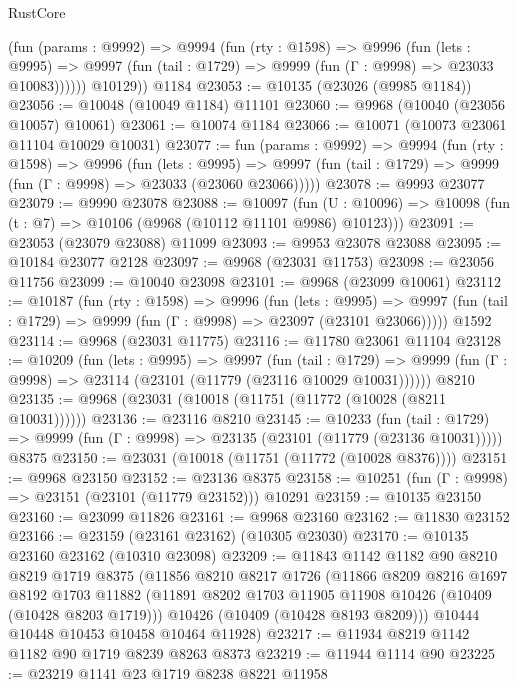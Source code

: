 \begin{lexlean}{RustCore}
\begin{coremodule}
          (fun (params : @9992) =>
          @9994
            (fun (rty : @1598) =>
            @9996
              (fun (lets : @9995) =>
              @9997 (fun (tail : @1729) => @9999 (fun (Γ : @9998) => @23033 @10083))))))
        @10129))
    @1184
@23053 := @10135 (@23026 (@9985 @1184))
@23056 := @10048 (@10049 @1184) @11101
@23060 := @9968 (@10040 (@23056 @10057) @10061)
@23061 := @10074 @1184
@23066 := @10071 (@10073 @23061 @11104 @10029 @10031)
@23077 := fun (params : @9992) =>
  @9994
    (fun (rty : @1598) =>
    @9996
      (fun (lets : @9995) =>
      @9997 (fun (tail : @1729) => @9999 (fun (Γ : @9998) => @23033 (@23060 @23066)))))
@23078 := @9993 @23077
@23079 := @9990 @23078
@23088 := @10097
    (fun (U : @10096) => @10098 (fun (t : @7) => @10106 (@9968 (@10112 @11101 @9986) @10123)))
@23091 := @23053 (@23079 @23088) @11099
@23093 := @9953 @23078 @23088
@23095 := @10184 @23077 @2128
@23097 := @9968 (@23031 @11753)
@23098 := @23056 @11756
@23099 := @10040 @23098
@23101 := @9968 (@23099 @10061)
@23112 := @10187
    (fun (rty : @1598) =>
    @9996
      (fun (lets : @9995) =>
      @9997 (fun (tail : @1729) => @9999 (fun (Γ : @9998) => @23097 (@23101 @23066)))))
    @1592
@23114 := @9968 (@23031 @11775)
@23116 := @11780 @23061 @11104
@23128 := @10209
    (fun (lets : @9995) =>
    @9997
      (fun (tail : @1729) =>
      @9999 (fun (Γ : @9998) => @23114 (@23101 (@11779 (@23116 @10029 @10031))))))
    @8210
@23135 := @9968 (@23031 (@10018 (@11751 (@11772 (@10028 (@8211 @10031))))))
@23136 := @23116 @8210
@23145 := @10233
    (fun (tail : @1729) => @9999 (fun (Γ : @9998) => @23135 (@23101 (@11779 (@23136 @10031)))))
    @8375
@23150 := @23031 (@10018 (@11751 (@11772 (@10028 @8376))))
@23151 := @9968 @23150
@23152 := @23136 @8375
@23158 := @10251 (fun (Γ : @9998) => @23151 (@23101 (@11779 @23152))) @10291
@23159 := @10135 @23150
@23160 := @23099 @11826
@23161 := @9968 @23160
@23162 := @11830 @23152
@23166 := @23159 (@23161 @23162) (@10305 @23030)
@23170 := @10135 @23160 @23162 (@10310 @23098)
@23209 := @11843
    @1142
    @1182
    @90
    @8210
    @8219
    @1719
    @8375
    (@11856
      @8210
      @8217
      @1726
      (@11866
        @8209
        @8216
        @1697
        @8192
        @1703
        @11882
        (@11891 @8202 @1703 @11905 @11908 @10426 (@10409 (@10428 @8203 @1719)))
        @10426
        (@10409 (@10428 @8193 @8209)))
      @10444
      @10448
      @10453
      @10458
      @10464
      @11928)
@23217 := @11934 @8219 @1142 @1182 @90 @1719 @8239 @8263 @8373
@23219 := @11944 @1114 @90
@23225 := @23219 @1141 @23 @1719 @8238 @8221 @11958

\end{coremodule}
\end{lexlean}
